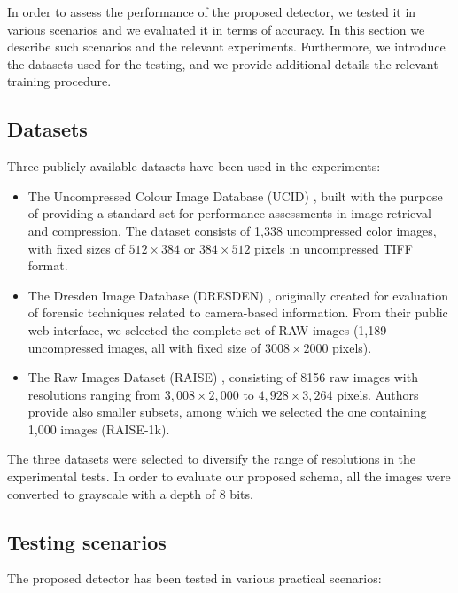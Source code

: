\documentclass[review]{elsarticle}
\begin{document}
In order to assess the performance of the proposed detector, we tested it in various scenarios and we evaluated it in terms of accuracy. In this section we describe such scenarios and the relevant experiments. Furthermore, we introduce the datasets used for the testing, and we provide additional details the relevant training procedure.

\subsection{Datasets}
\label{subsec:datasets}

Three publicly available datasets have been used in the experiments:
\begin{itemize}
	\item The Uncompressed Colour Image Database (UCID) \cite{schaefer2003ucid}, built with the purpose of providing a standard set for performance assessments in image retrieval and compression. The dataset consists of 1,338 uncompressed color images, with fixed sizes of $512\times384$ or $384\times512$ pixels in uncompressed TIFF format.
	\item The Dresden Image Database (DRESDEN) \cite{gloe2010dresden}, originally created for evaluation of forensic techniques related to camera-based information. From their public web-interface, we selected the complete set of RAW images (1,189 uncompressed images, all with fixed size of $3008\times2000$ pixels).
	\item The Raw Images Dataset (RAISE) \cite{dang2015raise}, consisting of 8156 raw images with resolutions ranging from $3,008\times2,000$ to $4,928\times3,264$ pixels. Authors provide also smaller subsets, among which we selected the one containing 1,000 images (RAISE-1k).
\end{itemize}

The three datasets were selected to diversify the range of resolutions in the experimental tests. In order to evaluate our proposed schema, all the images were converted to grayscale with a depth of 8 bits.

\subsection{Testing scenarios}
\label{subsec:test_scenarios}
The proposed detector has been tested in various practical scenarios:%
\end{document}
